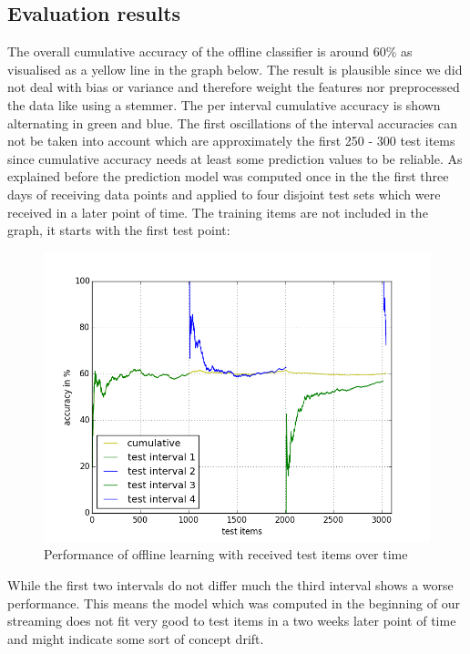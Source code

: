 \documentclass{article} %
\begin{document}
\subsection{Evaluation results}

The overall cumulative accuracy of the offline classifier is around 60\% as visualised as a yellow line in the graph below. The result is plausible since we did not deal with bias or variance and therefore weight the features nor preprocessed the data like using a stemmer. The per interval cumulative accuracy is shown alternating in green and blue. The first oscillations of the interval accuracies can not be taken into account which are approximately the first 250 - 300 test items since cumulative accuracy needs at least some prediction values to be reliable. As explained before the prediction model was computed once in the the first three days of receiving data points and applied to four disjoint test sets which were received in a later point of time. The training items are not included in the graph, it starts with the first test point:
\begin{figure}[htbp]
  \centering
  \includegraphics[scale=0.5]{./plots/batchPlot.png}
  \caption{Performance of offline learning with received test items over time}
\end{figure}
\newpage
While the first two intervals do not differ much the third interval shows a worse performance. This means the model which was computed in the beginning of our streaming does not fit very good to test items in a two weeks later point of time and  might indicate some sort of concept drift.\\
\end{document}
